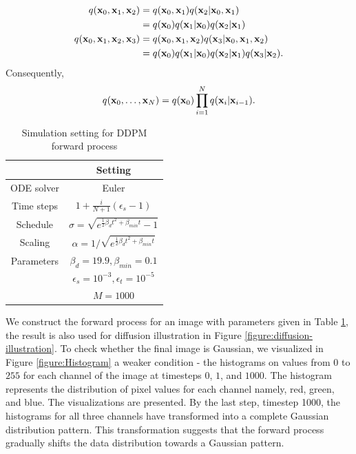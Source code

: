 \begin{align*}
 q(\mathbf{x}_0,\mathbf{x}_1,\mathbf{x}_2)
  & = q(\mathbf{x}_0,\mathbf{x}_1)q(\mathbf{x}_2|\mathbf{x}_0,\mathbf{x}_1)                   \\
  & =q(\mathbf{x}_0)q(\mathbf{x}_1|\mathbf{x}_0)q(\mathbf{x}_2|\mathbf{x}_1)                  \\
 q(\mathbf{x}_0,\mathbf{x}_1,\mathbf{x}_2,\mathbf{x}_3)
  & = q(\mathbf{x}_0,\mathbf{x}_1,\mathbf{x}_2)q(\mathbf{x}_3|\mathbf{x}_0,\mathbf{x}_1,\mathbf{x}_2)     \\
  & =q(\mathbf{x}_0)q(\mathbf{x}_1|\mathbf{x}_0)q(\mathbf{x}_2|\mathbf{x}_1)q(\mathbf{x}_3|\mathbf{x}_2).
\end{align*}
Consequently,
\begin{equation} q(\mathbf{x}_0,\ldots,\mathbf{x}_N)=q(\mathbf{x}_0)\prod\limits_{i=1}^Nq(\mathbf{x}_i|\mathbf{x}_{i-1}).
\end{equation}

\begin{table}[H]
 \begin{center}
  \begin{tabular}{cc}
   \hline
   \textbf{}  & \textbf{Setting}                                              \\ \hline
   ODE solver & Euler                                                         \\
   Time steps & $1 + \frac{i}{N+1}(\epsilon_s -1)$                            \\
   Schedule   & $\sigma = \sqrt{e^{\frac{1}{2}\beta_d t^2 + \beta_{min}t}-1}$ \\
   Scaling    & $\alpha = 1/\sqrt{e^{\frac{1}{2}\beta_d t^2 + \beta_{min}t}}$ \\ \hline
   Parameters & $\beta_d = 19.9, \beta_{min} = 0.1$                           \\
              & $\epsilon_s = 10^{-3}, \epsilon_t = 10^{-5}$                  \\
              & $M = 1000$                                                    \\ \hline
  \end{tabular}
 \end{center}
 \caption{Simulation setting for DDPM forward process}
 \label{table:simulation-setting-for-forward-ddpm}
\end{table}

We construct the forward process for an image with parameters given in Table \ref{table:simulation-setting-for-forward-ddpm}, the result is also used for diffusion illustration in Figure \ref{figure:diffusion-illustration}. To check whether the final image is Gaussian, we visualized in Figure \ref{figure:Histogram} a weaker condition - the histograms on values from $0$ to $255$ for each channel of the image at timesteps $0$, $1$, and $1000$. The histogram represents the distribution of pixel values for each channel namely, red, green, and blue. The visualizations are presented. By the last step, timestep 1000, the histograms for all three channels have transformed into a complete Gaussian distribution pattern. This transformation suggests that the forward process gradually shifts the data distribution towards a Gaussian pattern.

